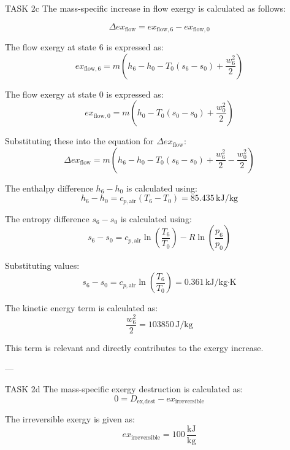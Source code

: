 TASK 2c  
The mass-specific increase in flow exergy is calculated as follows:  

\[
\Delta ex_{\text{flow}} = ex_{\text{flow},6} - ex_{\text{flow},0}
\]

The flow exergy at state 6 is expressed as:  
\[
ex_{\text{flow},6} = m \left( h_6 - h_0 - T_0 (s_6 - s_0) + \frac{w_6^2}{2} \right)
\]

The flow exergy at state 0 is expressed as:  
\[
ex_{\text{flow},0} = m \left( h_0 - T_0 (s_0 - s_0) + \frac{w_0^2}{2} \right)
\]

Substituting these into the equation for \(\Delta ex_{\text{flow}}\):  
\[
\Delta ex_{\text{flow}} = m \left( h_6 - h_0 - T_0 (s_6 - s_0) + \frac{w_6^2}{2} - \frac{w_0^2}{2} \right)
\]

The enthalpy difference \( h_6 - h_0 \) is calculated using:  
\[
h_6 - h_0 = c_{p,\text{air}} (T_6 - T_0) = 85.435 \, \text{kJ/kg}
\]

The entropy difference \( s_6 - s_0 \) is calculated using:  
\[
s_6 - s_0 = c_{p,\text{air}} \ln \left( \frac{T_6}{T_0} \right) - R \ln \left( \frac{p_6}{p_0} \right)
\]

Substituting values:  
\[
s_6 - s_0 = c_{p,\text{air}} \ln \left( \frac{T_6}{T_0} \right) = 0.361 \, \text{kJ/kg·K}
\]

The kinetic energy term is calculated as:  
\[
\frac{w_6^2}{2} = 103850 \, \text{J/kg}
\]

This term is relevant and directly contributes to the exergy increase.  

---

TASK 2d  
The mass-specific exergy destruction is calculated as:  
\[
0 = D_{\text{ex,dest}} - ex_{\text{irreversible}}
\]

The irreversible exergy is given as:  
\[
ex_{\text{irreversible}} = 100 \, \frac{\text{kJ}}{\text{kg}}
\]